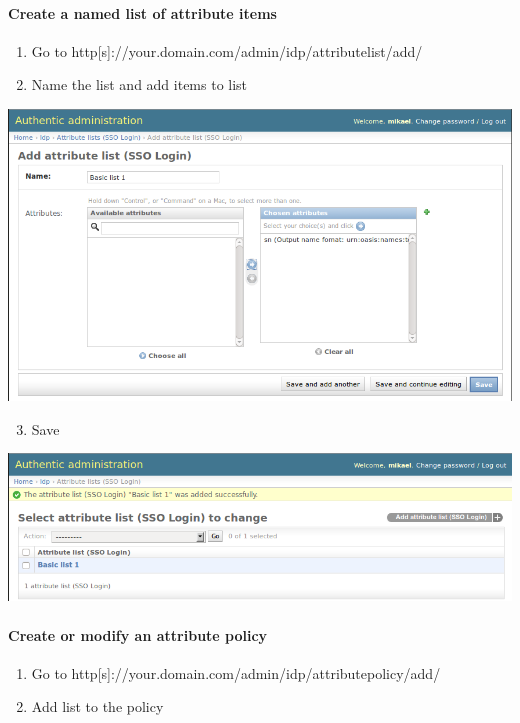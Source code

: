\documentclass[letterpaper,10pt,english]{sphinxmanual}
\begin{document}
\paragraph{Create a named list of attribute items}
\label{attribute_management:create-a-named-list-of-attribute-items}\begin{enumerate}
\item {} 
Go to http{[}s{]}://your.domain.com/admin/idp/attributelist/add/

\item {} 
Name the list and add items to list

\end{enumerate}

\includegraphics{attribute_list.png}
\begin{enumerate}
\setcounter{enumi}{2}
\item {} 
Save

\end{enumerate}

\includegraphics{attribute_list_saved.png}


\paragraph{Create or modify an attribute policy}
\label{attribute_management:create-or-modify-an-attribute-policy}\begin{enumerate}
\item {} 
Go to http{[}s{]}://your.domain.com/admin/idp/attributepolicy/add/

\item {} 
Add list to the policy

\end{enumerate}
\end{document}
